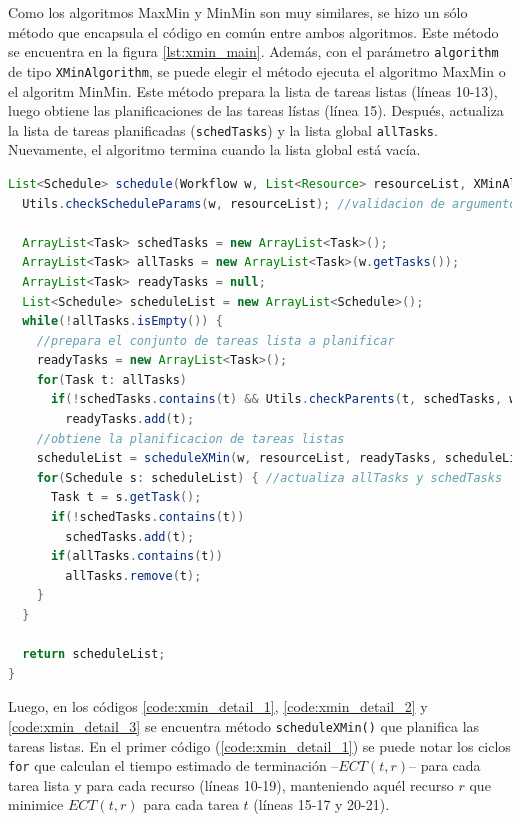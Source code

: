 Como los algoritmos MaxMin y MinMin son muy similares, se hizo un sólo método que encapsula el código en común entre ambos algoritmos. Este método se encuentra en la figura \ref{lst:xmin_main}. Además, con el parámetro \texttt{algorithm} de tipo \texttt{XMinAlgorithm}, se puede elegir el método ejecuta el algoritmo MaxMin o el algoritm MinMin. Este método prepara la lista de tareas listas (líneas 10-13), luego obtiene las planificaciones de las tareas lístas (línea 15). Después, actualiza la lista de tareas planificadas (\texttt{schedTasks}) y la lista global \texttt{allTasks}. Nuevamente, el algoritmo termina cuando la lista global está vacía.

\begin{lstlisting}[language=java,label={lst:xmin_main},caption={Método principal en Java para los algoritmos MaxMin y MinMin.},float]
List<Schedule> schedule(Workflow w, List<Resource> resourceList, XMinAlgorithm algorithm) {
  Utils.checkScheduleParams(w, resourceList); //validacion de argumentos

  ArrayList<Task> schedTasks = new ArrayList<Task>();
  ArrayList<Task> allTasks = new ArrayList<Task>(w.getTasks());
  ArrayList<Task> readyTasks = null;
  List<Schedule> scheduleList = new ArrayList<Schedule>();
  while(!allTasks.isEmpty()) {
    //prepara el conjunto de tareas lista a planificar
    readyTasks = new ArrayList<Task>();
    for(Task t: allTasks)
      if(!schedTasks.contains(t) && Utils.checkParents(t, schedTasks, w))
        readyTasks.add(t);
    //obtiene la planificacion de tareas listas
    scheduleList = scheduleXMin(w, resourceList, readyTasks, scheduleList, algorithm);
    for(Schedule s: scheduleList) { //actualiza allTasks y schedTasks
      Task t = s.getTask();
      if(!schedTasks.contains(t))
        schedTasks.add(t);
      if(allTasks.contains(t))
        allTasks.remove(t);
    }
  }

  return scheduleList;
}
\end{lstlisting}

Luego, en los códigos \ref{code:xmin_detail_1}, \ref{code:xmin_detail_2} y \ref{code:xmin_detail_3} se encuentra método \texttt{scheduleXMin()} que planifica las tareas listas. En el primer código (\ref{code:xmin_detail_1}) se puede notar los ciclos \texttt{for} que calculan el tiempo estimado de terminación --$ECT(t,r)$-- para cada tarea lista y para cada recurso (líneas 10-19), manteniendo aquél recurso $r$ que minimice $ECT(t,r)$ para cada tarea $t$ (líneas 15-17 y 20-21).

